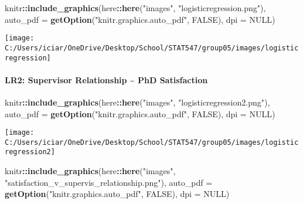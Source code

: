 \documentclass[
]{article}
\newenvironment{Shaded}{\begin{snugshade}}{\end{snugshade}}
\newcommand{\DataTypeTok}[1]{\textcolor[rgb]{0.13,0.29,0.53}{#1}}
\newcommand{\KeywordTok}[1]{\textcolor[rgb]{0.13,0.29,0.53}{\textbf{#1}}}
\newcommand{\NormalTok}[1]{#1}
\newcommand{\OperatorTok}[1]{\textcolor[rgb]{0.81,0.36,0.00}{\textbf{#1}}}
\newcommand{\OtherTok}[1]{\textcolor[rgb]{0.56,0.35,0.01}{#1}}
\newcommand{\StringTok}[1]{\textcolor[rgb]{0.31,0.60,0.02}{#1}}
\begin{document}
\begin{Shaded}
\begin{Highlighting}[]
\NormalTok{knitr}\OperatorTok{::}\KeywordTok{include_graphics}\NormalTok{(here}\OperatorTok{::}\KeywordTok{here}\NormalTok{(}\StringTok{"images"}\NormalTok{, }\StringTok{"logisticregression.png"}\NormalTok{), }\DataTypeTok{auto_pdf =} \KeywordTok{getOption}\NormalTok{(}\StringTok{"knitr.graphics.auto_pdf"}\NormalTok{, }\OtherTok{FALSE}\NormalTok{), }
    \DataTypeTok{dpi =} \OtherTok{NULL}\NormalTok{)}
\end{Highlighting}
\end{Shaded}

\texttt{[image: C:/Users/iciar/OneDrive/Desktop/School/STAT547/group05/images/logisticregression]}

\hypertarget{lr2-supervisor-relationship-phd-satisfaction}{%
\paragraph{LR2: Supervisor Relationship \textasciitilde{} PhD
Satisfaction}\label{lr2-supervisor-relationship-phd-satisfaction}}

\begin{Shaded}
\begin{Highlighting}[]
\NormalTok{knitr}\OperatorTok{::}\KeywordTok{include_graphics}\NormalTok{(here}\OperatorTok{::}\KeywordTok{here}\NormalTok{(}\StringTok{"images"}\NormalTok{, }\StringTok{"logisticregression2.png"}\NormalTok{), }\DataTypeTok{auto_pdf =} \KeywordTok{getOption}\NormalTok{(}\StringTok{"knitr.graphics.auto_pdf"}\NormalTok{, }\OtherTok{FALSE}\NormalTok{), }
    \DataTypeTok{dpi =} \OtherTok{NULL}\NormalTok{)}
\end{Highlighting}
\end{Shaded}

\texttt{[image: C:/Users/iciar/OneDrive/Desktop/School/STAT547/group05/images/logisticregression2]}

\begin{Shaded}
\begin{Highlighting}[]
\NormalTok{knitr}\OperatorTok{::}\KeywordTok{include_graphics}\NormalTok{(here}\OperatorTok{::}\KeywordTok{here}\NormalTok{(}\StringTok{"images"}\NormalTok{, }\StringTok{"satisfaction_v_supervis_relationship.png"}\NormalTok{), }\DataTypeTok{auto_pdf =} \KeywordTok{getOption}\NormalTok{(}\StringTok{"knitr.graphics.auto_pdf"}\NormalTok{, }\OtherTok{FALSE}\NormalTok{), }
    \DataTypeTok{dpi =} \OtherTok{NULL}\NormalTok{)}
\end{Highlighting}
\end{Shaded}
\end{document}
